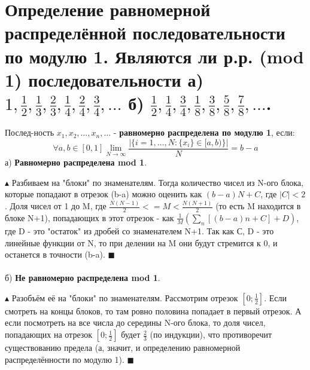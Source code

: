 \setcounter{section}{39}
\section{Определение равномерной распределённой последовательности по модулю 1. Являются ли р.р. (mod 1) последовательности а) $1, \frac{1}{2}, \frac{1}{3}, \frac{2}{3}, \frac{1}{4}, \frac{2}{4}, \frac{3}{4}, \dots$ б) $\frac{1}{2}, \frac{1}{4}, \frac{3}{4}, \frac{1}{8}, \frac{3}{8}, \frac{5}{8}, \frac{7}{8}, \dots$.}

Послед-ность $x_1, x_2, \dots, x_n, \dots$ - \textbf{равномерно распределена по модулю 1}, если:
\[ \forall a, b \in [0, 1] \lim_{N \to \infty} \frac{|\{i = 1, \dots, N: \{x_i\} \in [a, b)\}|}{N} = b - a \]
а) \textbf{Равномерно распределена mod 1}. \par
$\blacktriangle$
Разбиваем на "блоки" по знаменателям. Тогда количество чисел из N-ого блока, которые попадают в отрезок (b-a) можно оценить как $(b-a)N+C$, где $|C|<2$. Доля чисел от 1 до M, где $\frac{N(N-1)}{2} <= M < \frac{N(N+1)}{2}$ (то есть M находится в блоке N+1), попадающих в этот отрезок - как $\frac{1}{M} (\sum_n [(b-a)n + C] + D)$, где D - это "остаток" из дробей со знаменателем N+1. Так как С, D - это линейные функции от N, то при делении на M они будут стремится к 0, и останется в точности (b-a).
$\blacksquare$ \\
\\
б) \textbf{Не равномерно распределена mod 1}. \par
$\blacktriangle$
Разобъём её на "блоки" по знаменателям. Рассмотрим отрезок $[0; \frac{1}{2}]$. Если смотреть на концы блоков, то там ровно половина попадает в первый отрезок. А если посмотреть на все числа до середины N-ого блока, то доля чисел, попадающих на отрезок $[0; \frac{1}{2}]$ будет $\frac{2}{3}$ (по индукции), что противоречит существованию предела (а, значит, и определению равномерной распределённости по модулю 1).
$\blacksquare$